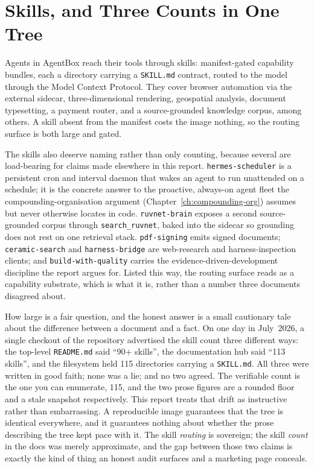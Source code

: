 \section{Skills, and Three Counts in One Tree}

Agents in AgentBox reach their tools through skills: manifest-gated capability bundles, each a directory carrying a \texttt{SKILL.md} contract, routed to the
model through the Model Context Protocol. They cover browser automation via the external sidecar, three-dimensional rendering, geospatial analysis, document
typesetting, a payment router, and a source-grounded knowledge corpus, among others. A skill absent from the manifest costs the image nothing, so the routing
surface is both large and gated.

The skills also deserve naming rather than only counting, because several are load-bearing for claims made elsewhere in this report. \texttt{hermes-scheduler} is a persistent cron and interval daemon that wakes an agent to run unattended on a schedule; it is the concrete answer to the proactive, always-on agent fleet the compounding-organisation argument (Chapter~\ref{ch:compounding-org}) assumes but never otherwise locates in code. \texttt{ruvnet-brain} exposes a second source-grounded corpus through \texttt{search\_ruvnet}, baked into the sidecar so grounding does not rest on one retrieval stack. \texttt{pdf-signing} emits signed documents; \texttt{ceramic-search} and \texttt{harness-bridge} are web-research and harness-inspection clients; and \texttt{build-with-quality} carries the evidence-driven-development discipline the report argues for. Listed this way, the routing surface reads as a capability substrate, which is what it is, rather than a number three documents disagreed about.

How large is a fair question, and the honest answer is a small cautionary tale about the difference between a document and a fact. On one day in July~2026, a
single checkout of the repository advertised the skill count three different ways: the top-level \texttt{README.md} said ``90+ skills'', the documentation hub
said ``113 skills'', and the filesystem held 115 directories carrying a \texttt{SKILL.md}. All three were written in good faith; none was a lie; and no two
agreed. The verifiable count is the one you can enumerate, 115, and the two prose figures are a rounded floor and a stale snapshot respectively. This report
treats that drift as instructive rather than embarrassing. A reproducible image guarantees that the tree is identical everywhere, and it guarantees nothing
about whether the prose describing the tree kept pace with it. The skill \emph{routing} is sovereign; the skill \emph{count} in the docs was merely approximate,
and the gap between those two claims is exactly the kind of thing an honest audit surfaces and a marketing page conceals.

